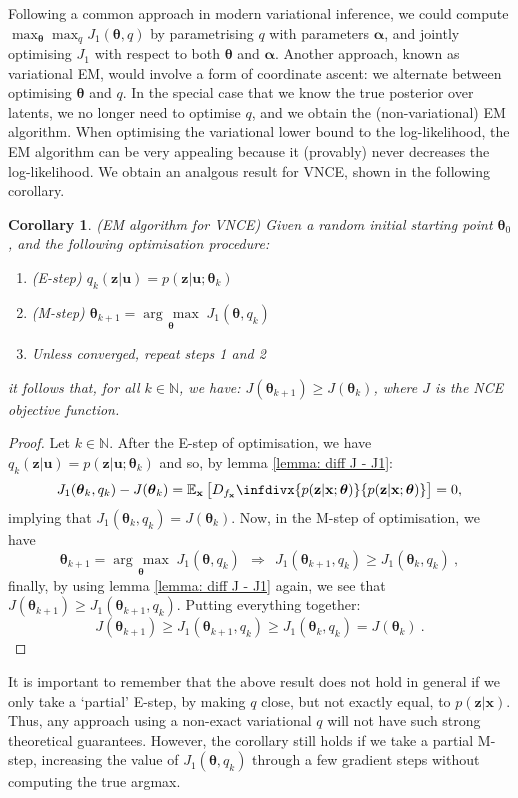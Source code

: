 \documentclass[11pt, oneside]{article}
\newcommand{\thetab}{{\boldsymbol{\theta}}}
\newcommand{\alphab}{{\boldsymbol{\alpha}}}
\renewcommand{\u}{{\mathbf u}}
\newcommand{\x}{{\mathbf x}}
\newcommand{\z}{{\mathbf z}}
\newcommand{\E}{\mathbb{E}}
\newcommand{\Ex}{\E_{\x}}
\newtheorem{corollary}{Corollary}[theorem]
\theoremstyle{definition}
\newcommand{\argmax}[1]{\underset{#1}{\operatorname{arg}\,\operatorname{max}}\;}
\newcommand{\infdiv}[1]{D_{#1}\infdivx}
\begin{document}
Following a common approach in modern variational inference, we could compute $\max_{\thetab} \max_{q} J_1(\thetab, q)$ by parametrising $q$ with parameters $\alphab$, and jointly optimising $J_1$ with respect to both $\thetab$ and $\alphab$. Another approach, known as variational EM, would involve a form of coordinate ascent: we alternate between optimising $\thetab$ and $q$. In the special case that we know the true posterior over latents, we no longer need to optimise $q$, and we obtain the (non-variational) EM algorithm. When optimising the variational lower bound to the log-likelihood, the EM algorithm can be very appealing because it (provably) never decreases the log-likelihood. We obtain an analgous result for VNCE, shown in the following corollary.
\begin{corollary}{(EM algorithm for VNCE)}
    Given a random initial starting point $\thetab_0$, and the following optimisation procedure:
    \begin{enumerate}
        \item (E-step) $q_k(\z | \u) = p(\z | \u ; \thetab_k) $ 
        \item (M-step) $\thetab_{k+1} = \argmax{\thetab} J_1(\thetab, q_k) $ 
        \item Unless converged, repeat steps 1 and 2
    \end{enumerate}
it follows that, for all $k \in \mathbb{N}$, we have:  $J(\thetab_{k+1}) \geq J(\thetab_k)$, where $J$ is the NCE objective function.
\end{corollary}
\begin{proof}
    Let $k \in \mathbb{N}$. After the E-step of optimisation, we have $q_k(\z | \u) = p(\z | \u ; \thetab_k)$ and so, by lemma \ref{lemma: diff J - J1}:
    \begin{align}
        J_1(\thetab_k, q_k) - J(\thetab_k) 
        = \Ex \left[ \infdiv{f_{\x}}{p(\z | \x; \thetab)}{p(\z | \x; \thetab)} \right]
        = 0,
    \end{align}
    implying that $J_1(\thetab_k, q_k) = J(\thetab_k)$. Now, in the M-step of optimisation, we have
    \begin{equation}
        \thetab_{k+1} = \argmax{\thetab} J_1(\thetab, q_k) \ \ \Longrightarrow \ \  J_1(\thetab_{k+1}, q_k) \geq J_1(\thetab_k, q_k) \ , 
    \end{equation}
    finally, by using lemma \ref{lemma: diff J - J1} again, we see that $J(\thetab_{k+1}) \geq J_1(\thetab_{k+1}, q_k)$. Putting everything together:
    \begin{equation}
        J(\thetab_{k+1}) \geq J_1(\thetab_{k+1}, q_k)  \geq J_1(\thetab_k, q_k) = J(\thetab_k) \ .
    \end{equation}
\end{proof}
It is important to remember that the above result does not hold in general if we only take a `partial' E-step, by making $q$ close, but not exactly equal, to $p(\z | \x)$. Thus, any approach using a non-exact variational $q$ will not have such strong theoretical guarantees. However, the corollary still holds if we take a partial M-step, increasing the value of $J_1(\thetab, q_k)$ through a few gradient steps without computing the true argmax.
\end{document}
